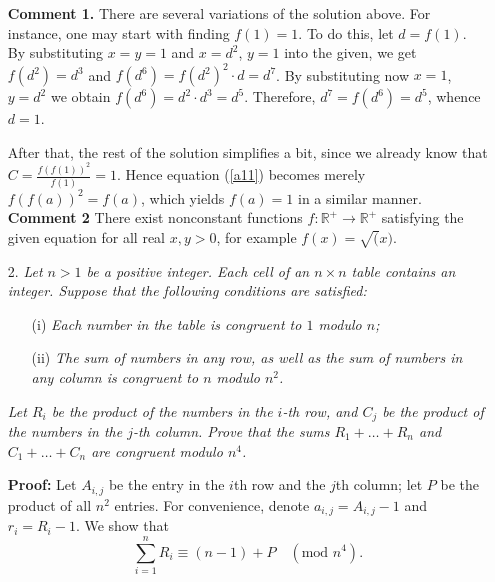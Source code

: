 \documentclass[a4paper, 12pt]{article}
\begin{document}
\begin{enumerate}
\textbf{Comment 1.}  There are several variations of the solution above.  For instance, one may start with finding $f(1) = 1$. To do this, let $d = f(1)$. By substituting $x = y = 1$ and $x = d^2$, $y=1$ into the given, we get $f(d^2) = d^3$ and $f(d^6) = f(d^2)^2 \cdot d = d^7$. By substituting now $x = 1$, $y = d^2$ we obtain $f(d^6) = d^2 \cdot d^3 = d^5$. Therefore, $d^7 = f(d^6) = d^5$, whence $d = 1$.

After that, the rest of the solution simplifies a bit, since we already know that $C = \frac{f(f(1))^2}{f(1)} = 1$. Hence equation (\ref{a11}) becomes merely $f(f(a))^2 = f(a)$, which yields $f(a) = 1$ in a similar manner. \\

\textbf{Comment 2} There exist nonconstant functions $f : \mathbb{R}^+ \to \mathbb{R}^+$ satisfying the given equation for all real $x, y > 0$, for example $f(x) = \sqrt(x)$. \\

\vspace{5mm}
\item[2.]  \textit{Let $n > 1$ be a positive integer. Each cell of an $n \times n$ table contains an integer. Suppose that the following conditions are satisfied:}

\begin{enumerate}
    \item[(i)] \textit{Each number in the table is congruent to $1$ modulo $n$;}
    
    \item[(ii)] \textit{The sum of numbers in any row, as well as the sum of numbers in any column is congruent to $n$ modulo $n^2$.}
    
\end{enumerate}

 \textit{Let $R_i$ be the product of the numbers in the $i$-th row, and $C_j$ be the product of the numbers in the $j$-th column. Prove that the sums $R_1 + \dots + R_n$ and $C_1 + \dots + C_n$ are congruent modulo $n^4$.}
 \vspace{5mm}

\textbf{Proof: } Let $A_{i,j}$ be the entry in the $i$th row and the $j$th column; let $P$ be the product of all $n^2$ entries. For convenience, denote $a_{i, j} = A_{i,j}-1$ and $r_i = R_i - 1$. We show that
\begin{equation} \label{n21}
    \sum_{i=1}^n R_i \equiv (n-1) + P \quad (\textrm{mod } n^4).
\end{equation}


\end{enumerate}
\end{document}
